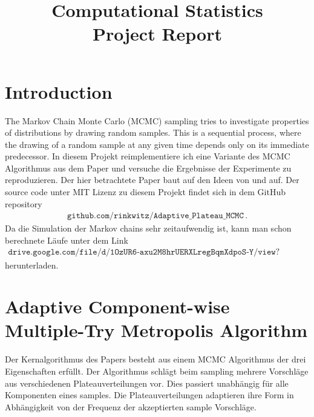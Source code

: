 \documentclass{scrartcl}
\title{Computational Statistics\\Project Report}
\begin{document}
    \maketitle

    \section{Introduction}
    The Markov Chain Monte Carlo (MCMC) sampling tries to investigate properties of distributions by drawing
    random samples. This is a sequential process, where the drawing of a random sample at any given
    time depends only on its immediate predecessor. In diesem Projekt reimplementiere ich eine Variante des MCMC Algorithmus aus dem Paper
    \cite{lau2019} und versuche die Ergebnisse der Experimente zu reproduzieren. Der hier betrachtete Paper baut auf den Ideen von
    \cite{metropolis1953,geyer1992,liu2000} und \cite{yang2019} auf.
    Der source code unter MIT Lizenz zu diesem Projekt findet sich in dem GitHub repository
    \begin{align*}
        \texttt{github.com/rinkwitz/Adaptive\_Plateau\_MCMC}\,.
    \end{align*}
    Da die Simulation der Markov chains sehr zeitaufwendig ist, kann man schon berechnete Läufe unter dem Link
    \begin{align*}
        \texttt{drive.google.com/file/d/1OzUR6-axu2M8hrUERXLregBqmXdpoS-Y/view?usp=sharing}
    \end{align*}
    herunterladen.

    \section{Adaptive Component-wise Multiple-Try Metropolis Algorithm} Der Kernalgorithmus
    des Papers \cite{lau2019} besteht aus einem MCMC Algorithmus der drei Eigenschaften erfüllt. Der Algorithmus schlägt
    beim sampling mehrere Vorschläge aus verschiedenen Plateauverteilungen vor. Dies passiert unabhängig für alle
    Komponenten eines samples. Die Plateauverteilungen adaptieren ihre Form in Abhängigkeit von der Frequenz der akzeptierten sample Vorschläge.
\end{document}
